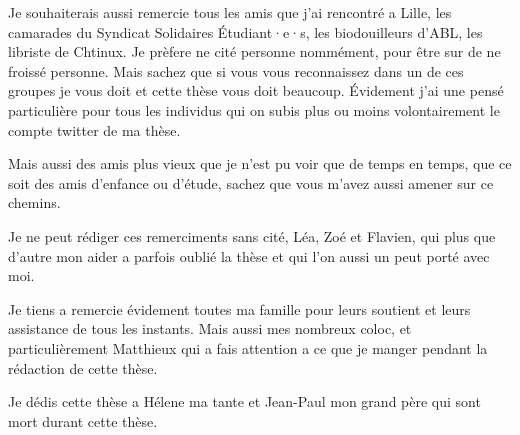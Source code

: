 \documentclass[main.tex]{subfiles}
\begin{document}
Je souhaiterais aussi remercie tous les amis que j'ai rencontré a Lille, les camarades du Syndicat Solidaires Étudiant·e·s, les biodouilleurs d'ABL, les libriste de Chtinux. Je prèfere ne cité personne nommément, pour être sur de ne froissé personne. Mais sachez que si vous vous reconnaissez dans un de ces groupes je vous doit et cette thèse vous doit beaucoup. Évidement j'ai une pensé particulière pour tous les individus qui on subis plus ou moins volontairement le compte twitter de ma thèse. 

Mais aussi des amis plus vieux que je n'est pu voir que de temps en temps, que ce soit des amis d'enfance ou d'étude, sachez que vous m'avez aussi amener sur ce chemins.

Je ne peut rédiger ces remerciments sans cité, Léa, Zoé et Flavien, qui plus que d'autre mon aider a parfois oublié la thèse et qui l'on aussi un peut porté avec moi.

Je tiens a remercie évidement toutes ma famille pour leurs soutient et leurs assistance de tous les instants. Mais aussi mes nombreux coloc, et particulièrement Matthieux qui a fais attention a ce que je manger pendant la rédaction de cette thèse.


Je dédis cette thèse a Hélene ma tante et Jean-Paul mon grand père qui sont mort durant cette thèse.
\end{document}
